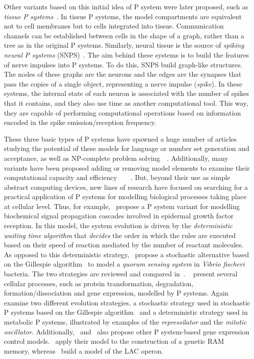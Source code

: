 \documentclass[runningheads,a4paper]{llncs}
\begin{document}
Other variants based on this initial idea of P system were later proposed, such as \emph{tissue P systems}~\cite{MartinVide2003}. In tissue P systems, the model compartments are equivalent not to cell membranes but to cells integrated into tissue. Communication channels can be established between cells in the shape of a graph, rather than a tree as in the original P systems. Similarly, neural tissue is the source of \emph{spiking neural P systems} (SNPS)~\cite{Ionescu2006}. The aim behind these systems is to build the features of nerve impulses into P systems. To do this, SNPS build graph-like structures. The nodes of these graphs are the neurons and the edges are the synapses that pass the copies of a single object, representing a nerve impulse (\emph{spike}). In these systems, the internal state of each neuron is associated with the number of spikes that it contains, and they also use time as another computational tool. This way, they are capable of performing computational operations based on information encoded in the spike emission/reception frequency.

These three basic types of P systems have spawned a huge number of articles studying the potential of these models for language or number set generation and acceptance, as well as NP-complete problem solving~\cite{Paun2001}~\cite{Leporati2009}. Additionally, many variants have been proposed adding or removing model elements to examine their computational capacity and efficiency~\cite{Cavaliere2004}~\cite{Alhazov2005}~\cite{Cavaliere2008}~\cite{Cavaliere2009}. But, beyond their use as simple abstract computing devices, new lines of research have focused on searching for a practical application of P systems for modelling biological processes taking place at cellular level. Thus, for example,~\cite{Paun2006} propose a P system variant for modelling biochemical signal propagation cascades involved in epidermal growth factor reception. In this model, the system evolution is driven by the \emph{deterministic waiting time algorithm} that \emph{decides} the order in which the rules are executed based on their speed of reaction mediated by the number of reactant molecules. As opposed to this deterministic strategy,~\cite{Bernardini2006} propose a stochastic alternative based on the Gillespie algorithm~\cite{Gillespie1977} to model a \emph{quorum sensing system} in \emph{Vibrio fischeri} bacteria. The two strategies are reviewed and compared in~\cite{PerezJimenez2006}. ~\cite{RomCamp2007} present several cellular processes, such as protein transformation, degradation, formation/dissociation and gene expression, modelled by P systems. Again~\cite{Gheorghe2010} examine two different evolution strategies, a stochastic strategy used in stochastic P systems based on the Gillespie algorithm~\cite{Gillespie1977} and a deterministic strategy used in metabolic P systems, illustrated by examples of the \emph{repressilator} and the \emph{mitotic oscillator}. Additionally,~\cite{Busi2006} and~\cite{RomCamp2008} also propose other P system-based gene expression control models.~\cite{Busi2006} apply their model to the construction of a genetic RAM memory, whereas~\cite{RomCamp2008} build a model of the LAC operon.
\end{document}
